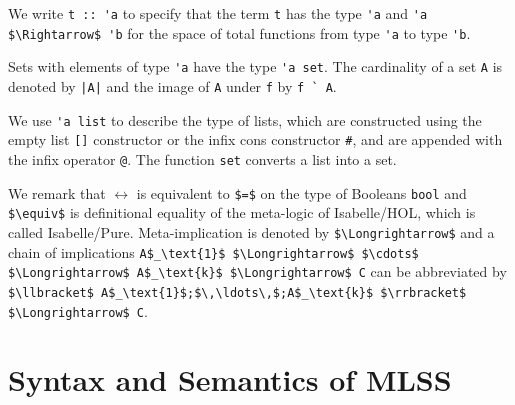 \documentclass[runningheads]{llncs}
\begin{document}
We write \lstinline!t :: 'a! to specify that the term \lstinline!t! has the type \lstinline!'a! and \lstinline!'a $\Rightarrow$ 'b! for the space of total functions from type \lstinline!'a! to type \lstinline!'b!.

Sets with elements of type \lstinline!'a! have the type \lstinline!'a set!.
The cardinality of a set \lstinline!A! is denoted by \lstinline!|A|! and the image of \lstinline!A! under \lstinline!f! by \lstinline!f ` A!.

We use \lstinline!'a list! to describe the type of lists, which are constructed using the empty list \lstinline![]! constructor or the infix cons constructor \lstinline!#!, and are appended with the infix operator \lstinline!@!.
The function \lstinline!set! converts a list into a set.

We remark that $\longleftrightarrow$ is equivalent to \lstinline!$=$! on the type of Booleans \lstinline!bool! and \lstinline!$\equiv$! is definitional equality of the meta-logic of Isabelle/HOL, which is called Isabelle/Pure.
Meta-implication is denoted by \lstinline!$\Longrightarrow$! and a chain of implications
\lstinline!A$_\text{1}$ $\Longrightarrow$ $\cdots$ $\Longrightarrow$ A$_\text{k}$ $\Longrightarrow$ C!
can be abbreviated by 
\lstinline!$\llbracket$ A$_\text{1}$;$\,\ldots\,$;A$_\text{k}$ $\rrbracket$ $\Longrightarrow$ C!.

\section{Syntax and Semantics of MLSS\label{sec:semantics}}
\end{document}
